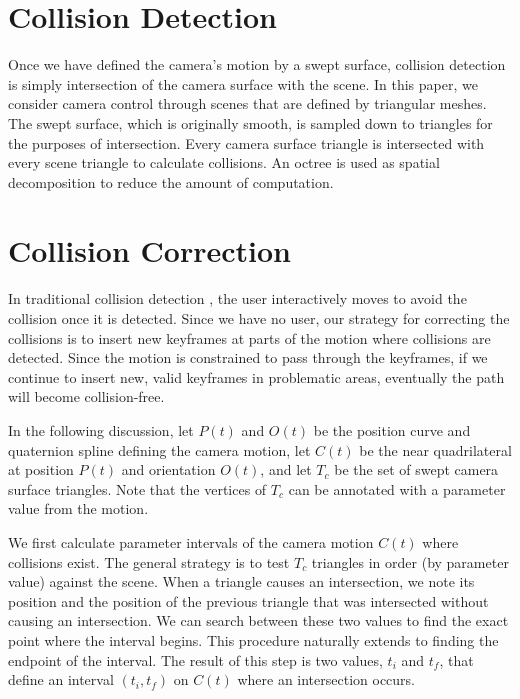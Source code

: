 \documentclass{sig-alternate}
\begin{document}
\section{Collision Detection} 

Once we have defined the camera's motion by a swept surface, collision
detection is simply intersection of the camera surface with the scene.
In this paper, we consider camera control through scenes that are defined by
triangular meshes.
The swept surface, which is originally smooth, is sampled down to triangles 
for the purposes of intersection.
Every camera surface triangle is intersected with every scene triangle to
calculate collisions.
An octree is used as spatial decomposition to reduce the amount of computation.

\section{Collision Correction}

In traditional collision detection \cite{ericson05}, the user interactively moves to avoid
the collision once it is detected.
Since we have no user, 
our strategy for correcting the collisions is to insert new keyframes at parts
of the motion where collisions are detected.
Since the motion is constrained to pass through the keyframes, if we continue
to insert new, valid keyframes in problematic areas, eventually the path will
become collision-free.

In the following discussion, let $P(t)$ and $O(t)$ be the position curve and
quaternion spline defining the camera motion, let $C(t)$ be the near
quadrilateral at position $P(t)$ and orientation $O(t)$, and
let $T_c$ be the set of swept camera surface triangles.
Note that the vertices of $T_c$ 
can be annotated with a parameter value from the motion.

We first calculate parameter intervals of the camera motion $C(t)$ where
collisions exist.
The general strategy is to test $T_c$ triangles in order (by parameter value)
against the scene.
When a triangle causes an intersection, we note its position and the position 
of the previous triangle that was intersected without causing an intersection.
We can search between these two values to find the exact point where the
interval begins.
This procedure naturally extends to finding the endpoint of the interval.
The result of this step is two values, $t_i$ and $t_f$, that 
define an interval $(t_i,t_f)$ on $C(t)$ where an intersection occurs.
\end{document}

